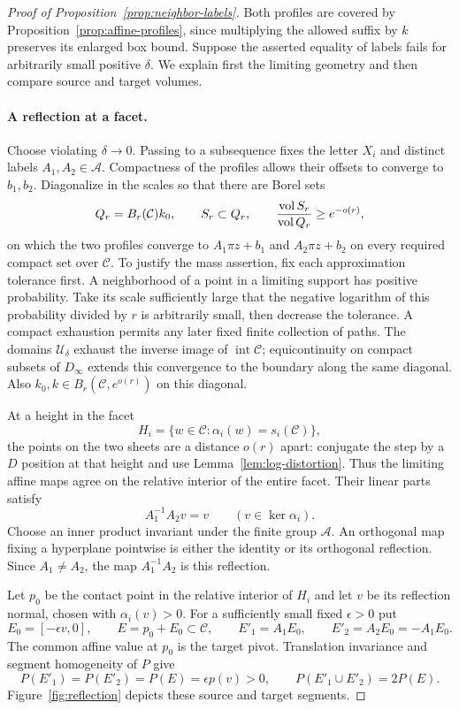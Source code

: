 \begin{proof}[Proof of Proposition~\ref{prop:neighbor-labels}]
Both profiles are covered by Proposition~\ref{prop:affine-profiles},
since multiplying the allowed suffix by $k$ preserves its enlarged box
bound.  Suppose the asserted equality of labels fails for arbitrarily
small positive $\delta$.  We explain first the limiting geometry and
then compare source and target volumes.

\paragraph{A reflection at a facet.}
Choose violating $\delta\to0$.  Passing to a subsequence fixes the
letter $X_i$ and distinct labels $A_1,A_2\in\mathcal A$.  Compactness
of the profiles allows their offsets to converge to $b_1,b_2$.
Diagonalize in the scales so that there are Borel sets
\[
 Q_r=B_r(\mathcal C)k_0,\qquad S_r\subset Q_r,\qquad
 \frac{\operatorname{vol} S_r}{\operatorname{vol} Q_r}\geq e^{-o(r)},
\]
on which the two profiles converge to
$A_1\pi z+b_1$ and $A_2\pi z+b_2$ on every required compact set over
$\mathcal C$.  To justify the mass assertion, fix each approximation
tolerance first.  A neighborhood of a point in a limiting support has
positive probability.  Take its scale sufficiently large that the
negative logarithm of this probability divided by $r$ is arbitrarily
small, then decrease the tolerance.  A compact exhaustion permits any
later fixed finite collection of paths.  The domains
$\mathcal U_\delta$ exhaust the inverse image of
$\operatorname{int}\mathcal C$; equicontinuity on compact subsets of
$D_\infty$ extends this convergence to the boundary along the same
diagonal.
Also $k_0,k\in B_r(\mathcal C,e^{o(r)})$ on this diagonal.

At a height in the facet
\[
 H_i=\{w\in\mathcal C:\alpha_i(w)=s_i(\mathcal C)\},
\]
the points on the two sheets are a distance $o(r)$ apart: conjugate the
step by a $D$ position at that height and use
Lemma~\ref{lem:log-distortion}.  Thus the limiting affine maps agree on
the relative interior of the entire facet.  Their linear parts satisfy
\[
 A_1^{-1}A_2 v=v\qquad(v\in\ker\alpha_i).
\]
Choose an inner product invariant under the finite group $\mathcal A$.
An orthogonal map fixing a hyperplane pointwise is either the identity
or its orthogonal reflection.  Since $A_1\ne A_2$, the map
$A_1^{-1}A_2$ is this reflection.

Let $p_0$ be the contact point in the relative interior of $H_i$ and
let $v$ be its reflection normal, chosen with $\alpha_i(v)>0$.
For a sufficiently small fixed $\epsilon>0$ put
\[
 E_0=[-\epsilon v,0],\qquad E=p_0+E_0\subset\mathcal C,
 \qquad E'_1=A_1E_0,\qquad E'_2=A_2E_0=-A_1E_0.
\]
The common affine value at $p_0$ is the target pivot.  Translation
invariance and segment homogeneity of $P$ give
\begin{equation}\label{eq:reflection-doubling}
 P(E'_1)=P(E'_2)=P(E)=\epsilon p(v)>0,
 \qquad P(E'_1\cup E'_2)=2P(E).
\end{equation}
Figure~\ref{fig:reflection} depicts these source and target segments.


\end{proof}
